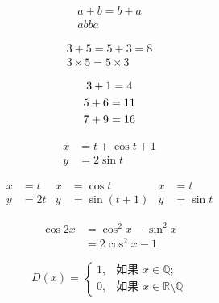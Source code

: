 \documentclass{article}
\begin{document}
	\begin{gather} %
	a + b =b + a\\
	ab ba
	\end{gather}
	 
	\begin{gather*} %
	3 + 5 = 5 + 3 =8 \\
	3 \times 5 = 5 \times 3
	\end{gather*}
	
	\begin{gather} %
		3 + 1 = 4 \notag\\
		5 + 6 =11 \notag\\
		7 + 9 = 16 \notag
		\end{gather}
	
	
	\begin{align}
	x &= t +\cos t + 1\\
	y &= 2\sin t
	\end{align}
	
	\begin{align*}
	x &= t & x &= \cos t & x & =t\\
	y &= 2t &  y &=\sin (t+1) & y &=\sin t
	\end{align*}
	
	\begin{equation}
	\begin{split}
	\cos 2x &= \cos^2 x - \sin^2 x\\
	&= 2\cos^2 x - 1
	\end{split}
	\end{equation}
	
	\begin{equation}
	D(x) = \begin{cases}
	1, & \text{如果 } x  \in \mathbb{Q};\\
	0, & \text{如果 } x  \in 
	\mathbb{R}\setminus\mathbb{Q}
	\end{cases}
	\end{equation}
	
\end{document}

